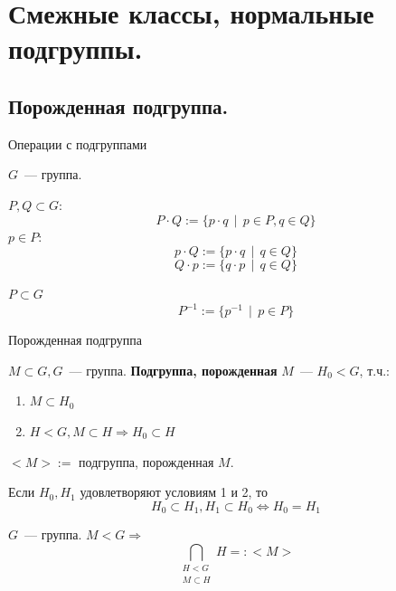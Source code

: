 
\section{Смежные классы, нормальные подгруппы.}

\subsection{Порожденная подгруппа.}

\begin{Definition}{Операции с подгруппами}{}
    
    $G$~--- группа.
    
    $P, Q \subset G$:
    \[
        P\cdot Q := \{p\cdot q\ \ | \ \ p \in P, q \in Q \}        
    \]
    $p \in P$:
    \[
        p\cdot Q := \{p\cdot q \ \ |\ \  q \in Q \}
    \]
    \[
        Q\cdot p := \{ q\cdot p\ \ | \ \ q \in Q \}
    \]

    $P \subset G$
    \[
        P^{-1} := \{ p^{-1} \ \ | \ \ p \in P \}
    \]
\end{Definition}

\begin{Definition}{Порожденная подгруппа}{}

    $M \subset G, G$~--- группа.
    \textbf{Подгруппа, порожденная} $M$~--- $H_0 < G$, т.ч.:

    \begin{enumerate}
        \item $M \subset H_0$
        \item $H < G, M \subset H \Rightarrow H_0 \subset H$
    \end{enumerate}

    $<M> :=$ подгруппа, порожденная $M$.
    
\end{Definition}

\begin{remark}

    Если $H_0, H_1$ удовлетворяют условиям 1 и 2, то 
    \[ H_0 \subset H_1, H_1 \subset H_0 \Leftrightarrow H_0 = H_1 \]
\end{remark}

\begin{Proposition}{}{}
    $G$~--- группа. $M < G \Rightarrow$
    \[ \bigcap_{\substack{ H < G \\ M \subset H}} H =: <M> \]
\end{Proposition}

